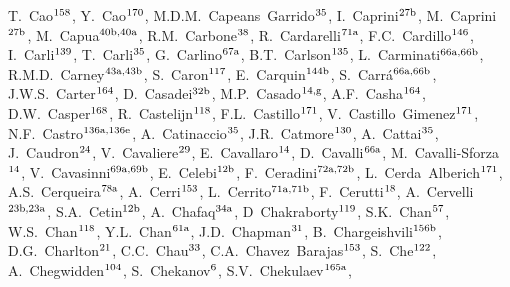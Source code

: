 \begin{flushleft}
T.~Cao$^\textrm{\scriptsize 158}$,    
Y.~Cao$^\textrm{\scriptsize 170}$,    
M.D.M.~Capeans~Garrido$^\textrm{\scriptsize 35}$,    
I.~Caprini$^\textrm{\scriptsize 27b}$,    
M.~Caprini$^\textrm{\scriptsize 27b}$,    
M.~Capua$^\textrm{\scriptsize 40b,40a}$,    
R.M.~Carbone$^\textrm{\scriptsize 38}$,    
R.~Cardarelli$^\textrm{\scriptsize 71a}$,    
F.C.~Cardillo$^\textrm{\scriptsize 146}$,    
I.~Carli$^\textrm{\scriptsize 139}$,    
T.~Carli$^\textrm{\scriptsize 35}$,    
G.~Carlino$^\textrm{\scriptsize 67a}$,    
B.T.~Carlson$^\textrm{\scriptsize 135}$,    
L.~Carminati$^\textrm{\scriptsize 66a,66b}$,    
R.M.D.~Carney$^\textrm{\scriptsize 43a,43b}$,    
S.~Caron$^\textrm{\scriptsize 117}$,    
E.~Carquin$^\textrm{\scriptsize 144b}$,    
S.~Carr\'a$^\textrm{\scriptsize 66a,66b}$,    
J.W.S.~Carter$^\textrm{\scriptsize 164}$,    
D.~Casadei$^\textrm{\scriptsize 32b}$,    
M.P.~Casado$^\textrm{\scriptsize 14,g}$,    
A.F.~Casha$^\textrm{\scriptsize 164}$,    
D.W.~Casper$^\textrm{\scriptsize 168}$,    
R.~Castelijn$^\textrm{\scriptsize 118}$,    
F.L.~Castillo$^\textrm{\scriptsize 171}$,    
V.~Castillo~Gimenez$^\textrm{\scriptsize 171}$,    
N.F.~Castro$^\textrm{\scriptsize 136a,136e}$,    
A.~Catinaccio$^\textrm{\scriptsize 35}$,    
J.R.~Catmore$^\textrm{\scriptsize 130}$,    
A.~Cattai$^\textrm{\scriptsize 35}$,    
J.~Caudron$^\textrm{\scriptsize 24}$,    
V.~Cavaliere$^\textrm{\scriptsize 29}$,    
E.~Cavallaro$^\textrm{\scriptsize 14}$,    
D.~Cavalli$^\textrm{\scriptsize 66a}$,    
M.~Cavalli-Sforza$^\textrm{\scriptsize 14}$,    
V.~Cavasinni$^\textrm{\scriptsize 69a,69b}$,    
E.~Celebi$^\textrm{\scriptsize 12b}$,    
F.~Ceradini$^\textrm{\scriptsize 72a,72b}$,    
L.~Cerda~Alberich$^\textrm{\scriptsize 171}$,    
A.S.~Cerqueira$^\textrm{\scriptsize 78a}$,    
A.~Cerri$^\textrm{\scriptsize 153}$,    
L.~Cerrito$^\textrm{\scriptsize 71a,71b}$,    
F.~Cerutti$^\textrm{\scriptsize 18}$,    
A.~Cervelli$^\textrm{\scriptsize 23b,23a}$,    
S.A.~Cetin$^\textrm{\scriptsize 12b}$,    
A.~Chafaq$^\textrm{\scriptsize 34a}$,    
D~Chakraborty$^\textrm{\scriptsize 119}$,    
S.K.~Chan$^\textrm{\scriptsize 57}$,    
W.S.~Chan$^\textrm{\scriptsize 118}$,    
Y.L.~Chan$^\textrm{\scriptsize 61a}$,    
J.D.~Chapman$^\textrm{\scriptsize 31}$,    
B.~Chargeishvili$^\textrm{\scriptsize 156b}$,    
D.G.~Charlton$^\textrm{\scriptsize 21}$,    
C.C.~Chau$^\textrm{\scriptsize 33}$,    
C.A.~Chavez~Barajas$^\textrm{\scriptsize 153}$,    
S.~Che$^\textrm{\scriptsize 122}$,    
A.~Chegwidden$^\textrm{\scriptsize 104}$,    
S.~Chekanov$^\textrm{\scriptsize 6}$,    
S.V.~Chekulaev$^\textrm{\scriptsize 165a}$,    

\end{flushleft}
